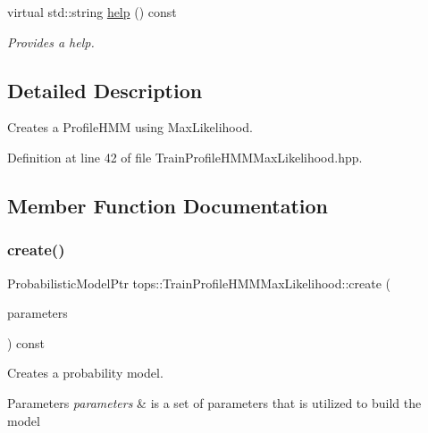 \begin{DoxyCompactItemize}
\item 
\mbox{\label{classtops_1_1TrainProfileHMMMaxLikelihood_a73cfab4b1ac555cbc5204ea955374220}} 
virtual std\+::string \hyperlink{classtops_1_1TrainProfileHMMMaxLikelihood_a73cfab4b1ac555cbc5204ea955374220}{help} () const
\begin{DoxyCompactList}\small\item\em Provides a help. \end{DoxyCompactList}\end{DoxyCompactItemize}


\subsection{Detailed Description}
Creates a Profile\+H\+MM using Max\+Likelihood. 

Definition at line 42 of file Train\+Profile\+H\+M\+M\+Max\+Likelihood.\+hpp.



\subsection{Member Function Documentation}
\mbox{\label{classtops_1_1TrainProfileHMMMaxLikelihood_ad73c7f1ec96af19a08186cfec7a141e7}} 
\subsubsection{\texorpdfstring{create()}{create()}}
{\footnotesize\ttfamily Probabilistic\+Model\+Ptr tops\+::\+Train\+Profile\+H\+M\+M\+Max\+Likelihood\+::create (\begin{DoxyParamCaption}\item[{\hyperlink{classtops_1_1ProbabilisticModelParameters}{Probabilistic\+Model\+Parameters} \&}]{parameters }\end{DoxyParamCaption}) const\hspace{0.3cm}{\ttfamily [virtual]}}



Creates a probability model. 


\begin{DoxyParams}{Parameters}
{\em parameters} & is a set of parameters that is utilized to build the model \\
\hline
\end{DoxyParams}


